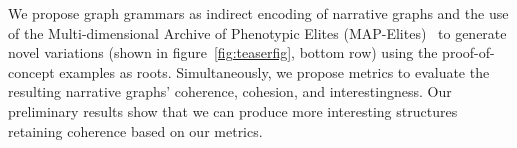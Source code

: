 
We propose graph grammars as indirect encoding of narrative graphs and the use of the Multi-dimensional Archive of Phenotypic Elites (MAP-Elites)~ to generate novel variations (shown in figure~\ref{fig:teaserfig}, bottom row) using the proof-of-concept examples as roots. Simultaneously, we propose metrics to evaluate the resulting narrative graphs' coherence, cohesion, and interestingness. Our preliminary results show that we can produce more interesting structures retaining coherence based on our metrics. 






